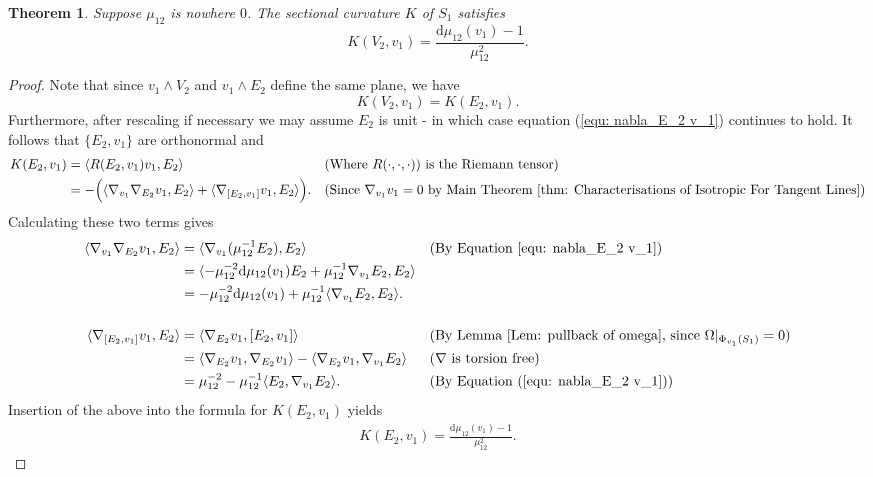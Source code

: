 \documentclass[12pt]{amsart}
\theoremstyle{plain}
\newtheorem{Thm}{Theorem}
\theoremstyle{definition}
\newcommand{\td}{\mathrm{d}}
\numberwithin{equation}{section}
\begin{document}
\begin{Thm} \label{Thm: sectional curvature from mu}
    Suppose $\mu_{12}$ is nowhere $0$. The sectional curvature $K$ of $S_1$ satisfies
    \[
    K(V_2,v_1)=\frac{\td\mu_{12}(v_1)-1}{\mu_{12}^2}.
    \]
\end{Thm}

\begin{proof}
         Note that since $v_1\wedge V_2$ and $v_1 \wedge E_2$ define the same plane, we have
         \[
         K(V_2,v_1)=K(E_2,v_1).
         \]
         Furthermore, after rescaling if necessary we may assume $E_2$ is unit - in which case equation (\ref{equ: nabla_E_2 v_1}) continues to hold. It follows that $\{E_2,v_1\}$ are orthonormal and
         \begin{align*}
         K(E_2,v_1)&=\langle R(E_2,v_1)v_1,E_2\rangle &&\text{(Where $R(\cdot,\cdot,\cdot))$ is the Riemann tensor)}\\
         &=-\Big(\langle \nabla_{v_1}\nabla_{E_2}v_1,E_2\rangle+\langle\nabla_{[E_2,v_1]}v_1,E_2\rangle\Big). && \text{(Since $\nabla_{v_1}v_1=0$ by Main Theorem \ref{thm: Characterisations of Isotropic For Tangent Lines})}
         \end{align*}
            Calculating these two terms gives
         \begin{align*}
             \langle \nabla_{v_1}\nabla_{E_2}v_1,E_2\rangle&=\langle \nabla_{v_1}(\mu_{12}^{-1}E_2),E_2\rangle &&\text{(By Equation \ref{equ: nabla_E_2 v_1})}\\
             &=\langle 
             -\mu_{12}^{-2}\td \mu_{12}(v_1)E_2+\mu_{12}^{-1}\nabla_{v_1}E_2,E_2\rangle\\
             &=-\mu_{12}^{-2}\td \mu_{12}(v_1)+\mu_{12}^{-1}\langle\nabla_{v_1}E_2,E_2\rangle.\\ \\
             \langle\nabla_{[E_2,v_1]}v_1,E_2\rangle&=\langle \nabla_{E_2}v_1,[E_2,v_1]\rangle &&\text{(By Lemma \ref{Lem: pullback of omega}, since $\Omega|_{\Phi_{v_1}(S_1)}=0$)}\\
             &=\langle \nabla_{E_2}v_1,\nabla_{E_2}v_1\rangle
-\langle \nabla_{E_2}v_1,\nabla_{v_1}E_2\rangle &&\text{($\nabla$ is torsion free)}\\
&=\mu_{12}^{-2}-\mu_{12}^{-1}\langle E_2, \nabla _{v_1}E_2\rangle. &&\text{(By Equation (\ref{equ: nabla_E_2 v_1}))}
         \end{align*}
         Insertion of the above into the formula for $K(E_2,v_1)$ yields
         \begin{align*}
         K(E_2,v_1)
=\frac{\td \mu_{12}(v_1)-1}{\mu_{12}^2}.
         \end{align*}
    \end{proof}
\end{document}
